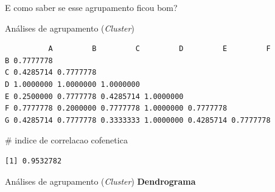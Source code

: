 \documentclass[
  ignorenonframetext,
]{beamer}
\newenvironment{Shaded}{\begin{snugshade}}{\end{snugshade}}
\newcommand{\CommentTok}[1]{\textcolor[rgb]{0.37,0.37,0.37}{#1}}
\begin{document}
\begin{frame}[fragile]{E como saber se esse agrupamento ficou bom?}
\begin{block}{Análises de agrupamento (\emph{Cluster})}
\begin{verbatim}
          A         B         C         D         E         F
B 0.7777778                                                  
C 0.4285714 0.7777778                                        
D 1.0000000 1.0000000 1.0000000                              
E 0.2500000 0.7777778 0.4285714 1.0000000                    
F 0.7777778 0.2000000 0.7777778 1.0000000 0.7777778          
G 0.4285714 0.7777778 0.3333333 1.0000000 0.4285714 0.7777778
\end{verbatim}

\begin{Shaded}
\begin{Highlighting}[]
\CommentTok{\# indice de correlacao cofenetica}
\end{Highlighting}
\end{Shaded}

\begin{verbatim}
[1] 0.9532782
\end{verbatim}
\end{block}

\begin{block}{Análises de agrupamento (\emph{Cluster})}
\protect\hypertarget{anuxe1lises-de-agrupamento-cluster-13}{}
\textbf{Dendrograma}
\end{block}
\end{frame}
\end{document}
